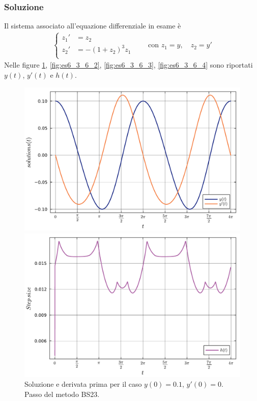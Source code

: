 \documentclass[letterpaper, 12pt]{article}
\numberwithin{equation}{section}    %
\begin{document}
\subsubsection{Soluzione}
Il sistema associato all'equazione differenziale in esame è 
\begin{align*}
\left\{
\begin{array}{rl}
    z_1' &= z_2 \\
    z_2' &= - (1+z_2)^3 z_1 \\
\end{array}
\right.
\qquad \text{con } z_1 = y, \quad z_2 = y'
\end{align*}
Nelle figure \ref{fig:es6_3_6_1}, \ref{fig:es6_3_6_2}, \ref{fig:es6_3_6_3}, \ref{fig:es6_3_6_4} 
sono riportati $y(t)$, $y'(t)$ e $h(t)$.
\begin{figure}[!ht]
    \centering
    \begin{minipage}[b]{0.47\textwidth}
        \includegraphics[width=\textwidth]{6361.pdf}
    \end{minipage}
    \hspace{0.5cm}
    \begin{minipage}[b]{0.47\textwidth}
        \includegraphics[width=\textwidth]{6362.pdf}
    \end{minipage}
    \caption{Soluzione e derivata prima per il caso $y(0) = 0.1$, $y'(0) = 0$. Passo del metodo BS23.}
    \label{fig:es6_3_6_1}
\end{figure}
\end{document}
